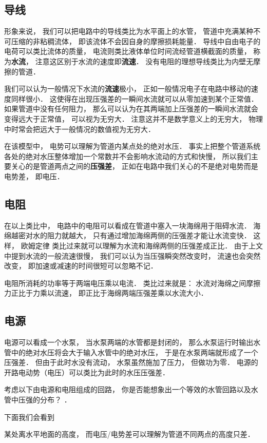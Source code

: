 

\subsection{导线}
形象来说， 我们可以把电路中的导线类比为水平面上的水管， 管道中充满某种不可压缩的非粘稠流体， 即该流体不会因自身的摩擦损耗能量． 导线中自由电子的电荷可以类比流体的质量， 电流则类比液体单位时间流经管道横截面的质量， 称为\textbf{水流}， 注意这区别于水流的速度即\textbf{流速}． 没有电阻的理想导线类比为内壁无摩擦的管道．

我们可以认为一般情况下水流的\textbf{流速}极小， 正如一般情况电子在电路中移动的速度同样很小． 这使得在出现压强差的一瞬间水流就可以从零加速到某个正常值． 如果管道中没有任何阻力， 那么可以认为在其两端加上压强差的一瞬间水流就会变得远大于正常值， 可以视为无穷大． 注意这并不是数学意义上的无穷大， 物理中时常会把远大于一般情况的数值视为无穷大．

在该模型中， 电势可以理解为管道内某点处的绝对水压． 事实上把整个管道系统各处的绝对水压整体增加一个常数并不会影响水流动的方式和快慢， 所以我们主要关心的是管道两点之间的\textbf{压强差}， 正如在电路中我们关心的不是绝对电势而是电势差， 即电压．

\subsection{电阻}
在以上类比中， 电路中的电阻可以看成在管道中塞入一块海绵用于阻碍水流． 海绵越密对水的阻力就越大， 只有通过增加海绵两侧的压强差才能让水流变快． 这样， 欧姆定律 类比过来就可以理解为水流和海绵两侧的压强差成正比． 由于上文中提到水流的一般流速很慢， 我们可以认为当压强瞬突然改变时， 流速也会突然改变， 即加速或减速的时间很短可以忽略不记．

电阻所消耗的功率等于两端电压乘以电流． 类比过来就是： 水流对海绵之间摩擦力正比于力乘以流速， 即正比于海绵两端压强差乘以水流大小．

\subsection{电源}
电源可以看成一个水泵， 当水泵两端的水管都是封闭的， 那么水泵运行时输出水管中的绝对水压将会大于输入水管中的绝对水压， 于是在水泵两端就形成了一个压强差． 但由于此时水没有流动， 水泵虽然施加了压力， 但做功为零． 电源的开路电动势（电压）可以类比为此时的水压压强差．

\begin{exercise}{}
考虑以下由电源和电阻组成的回路， 你是否能想象出一个等效的水管回路以及水管中压强的分布？
．
\end{exercise}



下面我们会看到

某处离水平地面的高度， 而电压/电势差可以理解为管道不同两点的高度只差．
